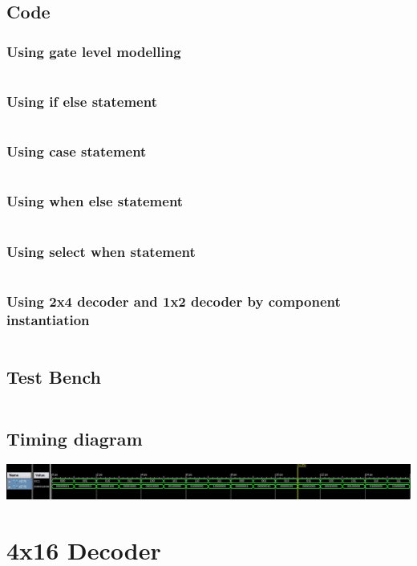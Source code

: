 \documentclass[titlepage]{article}
\begin{document}
    \subsection{Code}
    \subsubsection{Using gate level modelling}
        \inputminted{vhdl}{./codes/a3_2_2a.vhd}
    \subsubsection{Using if else statement} 
        \inputminted{vhdl}{./codes/a3_2_2ba.vhd}
    \subsubsection{Using case statement}
        \inputminted{vhdl}{./codes/a3_2_2bb.vhd}
    \subsubsection{Using when else statement}
        \inputminted{vhdl}{./codes/a3_2_2bc.vhd}
    \subsubsection{Using select when statement}
        \inputminted{vhdl}{./codes/a3_2_2bd.vhd}
    \subsubsection{Using 2x4 decoder and 1x2 decoder by component instantiation}
        \inputminted{vhdl}{./codes/a3_3.vhd}
    \subsection{Test Bench}
    \inputminted{vhdl}{./codes/tb_a3_2_2a.vhd}
    \subsection{Timing diagram}
    \includegraphics[width=19cm]{./figures/td_3x8.jpeg}


    \section{4x16 Decoder}
\end{document}
